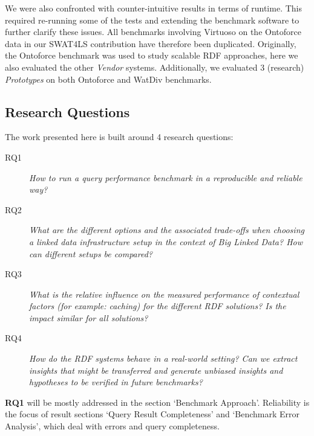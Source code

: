 We were also confronted with counter-intuitive results in terms of runtime. This required re-running some of the tests and extending the benchmark software to further clarify these issues. All benchmarks involving Virtuoso on the Ontoforce data in our SWAT4LS contribution have therefore been duplicated.
Originally, the Ontoforce benchmark was used to study scalable RDF approaches, here we also evaluated the other \emph{Vendor} systems. Additionally, we evaluated 3 (research) \emph{Prototypes} on both Ontoforce and WatDiv benchmarks.


\subsection{Research Questions}

The work presented here is built around 4 research questions:

\begin{description}
\item[RQ1] \emph{How to run a query performance benchmark in a reproducible and reliable way?}
\item[RQ2] \emph{What are the different options and the associated trade-offs when choosing a linked data infrastructure setup in the context of Big Linked Data? How can different setups be compared?}
\item[RQ3] \emph{What is the relative influence on the measured performance of contextual factors (for example: caching) for the different RDF solutions? Is the impact similar for all solutions?}
\item[RQ4] \emph{How do the RDF systems behave in a real-world setting? Can we extract insights that might be transferred and generate unbiased insights and hypotheses to be verified in future benchmarks?}
\end{description} 

\textbf{RQ1} will be mostly addressed in the section `Benchmark Approach'. Reliability is the focus of result sections `Query Result Completeness' and `Benchmark Error Analysis', 
which deal with errors and query completeness. 

